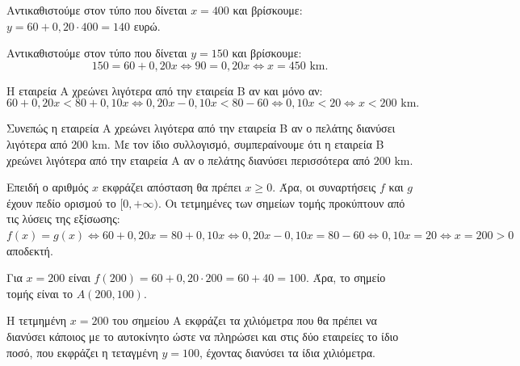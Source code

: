 
\begin{alist}
\item Αντικαθιστούμε στον τύπο που δίνεται $x = 400$ και βρίσκουμε:
$y = 60 + 0,20 \cdot 400 = 140$ ευρώ.

\item Αντικαθιστούμε στον τύπο που δίνεται $y = 150$ και βρίσκουμε:
\[150 = 60 + 0,20x \Leftrightarrow 90 = 0,20x \Leftrightarrow x = 450 \text{ km}.\]

\item Η εταιρεία Α χρεώνει λιγότερα από την εταιρεία Β αν και μόνο αν:
\[60 + 0,20x < 80 + 0,10x \Leftrightarrow 0,20x - 0,10x < 80 - 60 \Leftrightarrow 0,10x < 20 \Leftrightarrow x < 200 \text{ km}.\]

Συνεπώς η εταιρεία Α χρεώνει λιγότερα από την εταιρεία Β αν ο πελάτης διανύσει λιγότερα
από $200 \text{ km}$. Με τον ίδιο συλλογισμό, συμπεραίνουμε ότι η εταιρεία Β χρεώνει λιγότερα
από την εταιρεία Α αν ο πελάτης διανύσει περισσότερα από $200 \text{ km}$.

\item Επειδή ο αριθμός $x$ εκφράζει απόσταση θα πρέπει $x \ge 0$. Άρα, οι συναρτήσεις $f$ και $g$
έχουν πεδίο ορισμού το $[0, +\infty)$. Οι τετμημένες των σημείων τομής προκύπτουν από τις
λύσεις της εξίσωσης:
$f(x) = g(x) \Leftrightarrow 60 + 0,20x = 80 + 0,10x \Leftrightarrow 0,20x - 0,10x = 80 - 60 \Leftrightarrow 0,10x = 20 \Leftrightarrow x = 200 > 0$ αποδεκτή.

Για $x = 200$ είναι $f(200) = 60 + 0,20 \cdot 200 = 60 + 40 = 100$. Άρα, το σημείο τομής είναι
το $A(200, 100)$.

Η τετμημένη $x = 200$ του σημείου A εκφράζει τα χιλιόμετρα που θα πρέπει να διανύσει
κάποιος με το αυτοκίνητο ώστε να πληρώσει και στις δύο εταιρείες το ίδιο ποσό, που
εκφράζει η τεταγμένη $y = 100$, έχοντας διανύσει τα ίδια χιλιόμετρα.
\end{alist}

